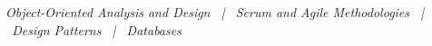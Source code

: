 %
\emph{Object-Oriented Analysis and Design \ | \ Scrum and Agile Methodologies \ | \ Design Patterns \ | \ Databases}
